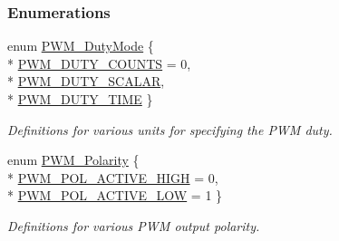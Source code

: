 \subsubsection*{Enumerations}
\begin{DoxyCompactItemize}
\item 
enum \hyperlink{_p_w_m_8h_a6c5ba2703cb9cc02773b5073046c1607}{P\+W\+M\+\_\+\+Duty\+Mode} \{ \\*
\hyperlink{_p_w_m_8h_a6c5ba2703cb9cc02773b5073046c1607a4a20018a9620ed669dff0893858a44b2}{P\+W\+M\+\_\+\+D\+U\+T\+Y\+\_\+\+C\+O\+U\+N\+T\+S} = 0, 
\\*
\hyperlink{_p_w_m_8h_a6c5ba2703cb9cc02773b5073046c1607a2611c911a0eba0b814c8da5e464d2864}{P\+W\+M\+\_\+\+D\+U\+T\+Y\+\_\+\+S\+C\+A\+L\+A\+R}, 
\\*
\hyperlink{_p_w_m_8h_a6c5ba2703cb9cc02773b5073046c1607a4e450c41a62390183087c6ec32e65bd5}{P\+W\+M\+\_\+\+D\+U\+T\+Y\+\_\+\+T\+I\+M\+E}
 \}
\begin{DoxyCompactList}\small\item\em Definitions for various units for specifying the P\+W\+M duty. \end{DoxyCompactList}\item 
enum \hyperlink{_p_w_m_8h_affa60cc974f99db4aeafc9f6524ec593}{P\+W\+M\+\_\+\+Polarity} \{ \\*
\hyperlink{_p_w_m_8h_affa60cc974f99db4aeafc9f6524ec593a9a0765651cee5c3bb3f4ca3dc87a328e}{P\+W\+M\+\_\+\+P\+O\+L\+\_\+\+A\+C\+T\+I\+V\+E\+\_\+\+H\+I\+G\+H} = 0, 
\\*
\hyperlink{_p_w_m_8h_affa60cc974f99db4aeafc9f6524ec593a4862fe820788c4fec725cc91db2649c5}{P\+W\+M\+\_\+\+P\+O\+L\+\_\+\+A\+C\+T\+I\+V\+E\+\_\+\+L\+O\+W} = 1
 \}
\begin{DoxyCompactList}\small\item\em Definitions for various P\+W\+M output polarity. \end{DoxyCompactList}\end{DoxyCompactItemize}
